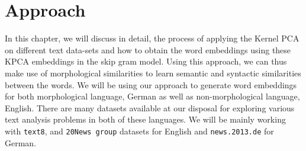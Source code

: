 \chapter{Approach}
\label{cha:approach}
In this chapter, we will discuss in detail, the process of applying the Kernel PCA on different text data-sets and how to obtain the word embeddings using these KPCA embeddings in the skip gram model. Using this approach, we can thus make use of morphological similarities to learn semantic and syntactic similarities between the words. We will be using our approach to generate word embeddings for both morphological language, German as well as non-morphological language, English. There are many datasets available at our disposal for exploring various text analysis problems in both of these languages. We will be mainly working with \texttt{text8},  and \texttt{20News group} datasets for English and \texttt{news.2013.de} for German.

